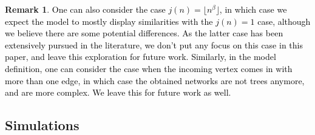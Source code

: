 \documentclass[letterpaper,11pt,reqno]{amsart}
\theoremstyle{definition}
\newtheorem{rem}[thm]{Remark}
\begin{document}
\begin{rem}\label{rem:future_work_general_j_nontree}
    \textcolor{black}{One can also consider the case $j(n)=\lfloor n^{\beta} \rfloor$, in which case we expect the model to mostly display similarities with the $j(n)=1$ case, although we believe there are some potential differences. As the latter case has been extensively pursued in the literature, we don't put any focus on this case in this paper, and leave this exploration for future work. Similarly, in the model definition, one can consider the case when the incoming vertex comes in with more than one edge, in which case the obtained networks are not trees anymore, and are more complex. We leave this for future work as well.}
\end{rem}

\subsection{Simulations}\label{sec:sims}
\end{document}
